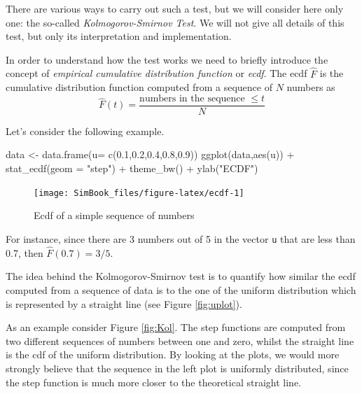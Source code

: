 \documentclass[
]{book}
\newenvironment{Shaded}{\begin{snugshade}}{\end{snugshade}}
\newcommand{\AttributeTok}[1]{\textcolor[rgb]{0.77,0.63,0.00}{#1}}
\newcommand{\FloatTok}[1]{\textcolor[rgb]{0.00,0.00,0.81}{#1}}
\newcommand{\FunctionTok}[1]{\textcolor[rgb]{0.00,0.00,0.00}{#1}}
\newcommand{\NormalTok}[1]{#1}
\newcommand{\OtherTok}[1]{\textcolor[rgb]{0.56,0.35,0.01}{#1}}
\newcommand{\SpecialCharTok}[1]{\textcolor[rgb]{0.00,0.00,0.00}{#1}}
\newcommand{\StringTok}[1]{\textcolor[rgb]{0.31,0.60,0.02}{#1}}
\begin{document}
There are various ways to carry out such a test, but we will consider here only one: the so-called \emph{Kolmogorov-Smirnov Test}. We will not give all details of this test, but only its interpretation and implementation.

In order to understand how the test works we need to briefly introduce the concept of \emph{empirical cumulative distribution function} or \emph{ecdf}. The ecdf \(\hat{F}\) is the cumulative distribution function computed from a sequence of \(N\) numbers as
\[
\hat{F}(t)= \frac{\mbox{numbers in the sequence }\leq t}{N}
\]

Let's consider the following example.

\begin{Shaded}
\begin{Highlighting}[]
\NormalTok{data }\OtherTok{\textless{}{-}} \FunctionTok{data.frame}\NormalTok{(}\AttributeTok{u=} \FunctionTok{c}\NormalTok{(}\FloatTok{0.1}\NormalTok{,}\FloatTok{0.2}\NormalTok{,}\FloatTok{0.4}\NormalTok{,}\FloatTok{0.8}\NormalTok{,}\FloatTok{0.9}\NormalTok{))}
\FunctionTok{ggplot}\NormalTok{(data,}\FunctionTok{aes}\NormalTok{(u)) }\SpecialCharTok{+} \FunctionTok{stat\_ecdf}\NormalTok{(}\AttributeTok{geom =} \StringTok{"step"}\NormalTok{) }\SpecialCharTok{+} \FunctionTok{theme\_bw}\NormalTok{() }\SpecialCharTok{+} \FunctionTok{ylab}\NormalTok{(}\StringTok{"ECDF"}\NormalTok{)}
\end{Highlighting}
\end{Shaded}

\begin{figure}

{\centering \texttt{[image: SimBook\_files/figure-latex/ecdf-1]} 

}

\caption{Ecdf of a simple sequence of numbers}\label{fig:ecdf}
\end{figure}

For instance, since there are 3 numbers out of 5 in the vector \texttt{u} that are less than 0.7, then \(\hat{F}(0.7)=3/5\).

The idea behind the Kolmogorov-Smirnov test is to quantify how similar the ecdf computed from a sequence of data is to the one of the uniform distribution which is represented by a straight line (see Figure \ref{fig:uplot}).

As an example consider Figure \ref{fig:Kol}. The step functions are computed from two different sequences of numbers between one and zero, whilst the straight line is the cdf of the uniform distribution. By looking at the plots, we would more strongly believe that the sequence in the left plot is uniformly distributed, since the step function is much more closer to the theoretical straight line.
\end{document}
